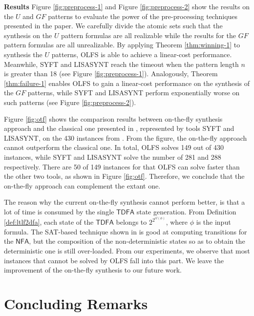 \documentclass[letterpaper]{article} %
\def\NFA{$\mathsf{NFA}$\xspace}
\def\tdfa{$\mathsf{TDFA}$\xspace}
\def\SAT{\textsf{SAT}\xspace}
\newcommand{\syft}{{\sf SYFT}\xspace}
\newcommand{\lisasyft}{{\sf LISASYNT}\xspace}
\newcommand{\toolname}{{\sf OLFS}\xspace}
\begin{document}
\noindent\textbf{Results} Figure \ref{fig:preprocess-1} and Figure \ref{fig:preprocess-2} show the results on the $U$ and $GF$ patterns to evaluate the power of the pre-processing techniques presented in the paper. We carefully divide the atomic sets such that the synthesis on the $U$ pattern formulas are all realizable while the results for the $GF$ pattern formulas are all unrealizable. By applying Theorem \ref{thm:winning-1} to synthesis the $U$ patterns, \toolname is able to achieve a linear-cost performance. Meanwhile, \syft and \lisasyft reach the timeout when the pattern length $n$ is greater than 18 (see Figure \ref{fig:preprocess-1}). Analogously, Theorem \ref{thm:failure-1} enables \toolname to gain a linear-cost performance on the synthesis of the $GF$ patterns, while \syft and \lisasyft perform exponentially worse on such patterns (see Figure \ref{fig:preprocess-2}). 

Figure \ref{fig:otf} shows the comparison results between on-the-fly synthesis approach and the classical one presented in \cite{GV15}, represented by tools \syft and \lisasyft, on the 430 instances from \cite{BLTV20}. From the figure, the on-the-fly approach cannot outperform the classical one. In total, \toolname solves 149 out of 430 instances, while \syft and \lisasyft solve the number of 281 and 288 respectively. There are 50 of 149 instances for that \toolname can solve faster than the other two tools, as shown in Figure \ref{fig:otf}. Therefore, we conclude that the on-the-fly approach can complement the extant one. 

The reason why the current on-the-fly synthesis cannot perform better, is that a lot of time is consumed by the single \tdfa state generation. From Definition \ref{def:ltlf2dfa}, each state of the \tdfa belongs to $2^{2^{cl(\phi)}}$, where $\phi$ is the input formula. The \SAT-based technique shown in \cite{LRPZV19} is good at computing transitions for the \NFA, but the composition of the non-deterministic states so as to obtain the deterministic one is still over-loaded. From our experiments, we observe that most instances that cannot be solved by \toolname fall into this part. We leave the improvement of the on-the-fly synthesis to our future work.






%
\section{Concluding Remarks}\label{sec:con}
\end{document}
